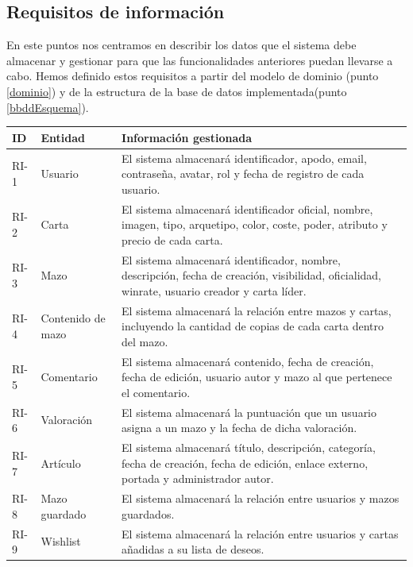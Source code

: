 \documentclass[10pt]{article}
\begin{document}
	\subsection{Requisitos de información}
	En este puntos nos centramos en  describir los datos que el sistema debe almacenar y gestionar para que las funcionalidades anteriores puedan llevarse a cabo. Hemos definido estos requisitos a partir del modelo de dominio (punto \ref{dominio}) y de la estructura de la base de datos implementada(punto \ref{bbddEsquema}).
	\noindent
	\begin{xltabular}{\textwidth}{|l|l|X|}
		\hline
		 \textbf{ID} & \textbf{Entidad} & \textbf{Información gestionada} \\ \hline
		
		RI-1 & Usuario & El sistema almacenará identificador, apodo, email, contraseña, avatar, rol y fecha de registro de cada usuario. \\ \hline
		RI-2 & Carta & El sistema almacenará identificador oficial, nombre, imagen, tipo, arquetipo, color, coste, poder, atributo y precio de cada carta. \\ \hline
		RI-3 & Mazo & El sistema almacenará identificador, nombre, descripción, fecha de creación, visibilidad, oficialidad, winrate, usuario creador y carta líder. \\ \hline
		RI-4 & Contenido de mazo & El sistema almacenará la relación entre mazos y cartas, incluyendo la cantidad de copias de cada carta dentro del mazo. \\ \hline
		RI-5 & Comentario & El sistema almacenará contenido, fecha de creación, fecha de edición, usuario autor y mazo al que pertenece el comentario. \\ \hline
		RI-6 & Valoración & El sistema almacenará la puntuación que un usuario asigna a un mazo y la fecha de dicha valoración. \\ \hline
		RI-7 & Artículo & El sistema almacenará título, descripción, categoría, fecha de creación, fecha de edición, enlace externo, portada y administrador autor. \\ \hline
		RI-8 & Mazo guardado & El sistema almacenará la relación entre usuarios y mazos guardados. \\ \hline
		RI-9 & Wishlist & El sistema almacenará la relación entre usuarios y cartas añadidas a su lista de deseos. \\ \hline
		
	\end{xltabular}
	
\end{document}
